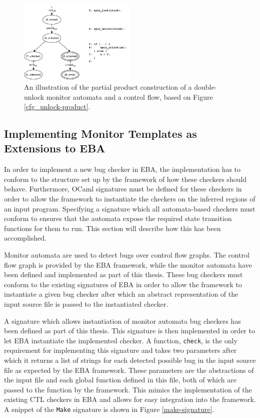 \begin{figure}[H]
    \centering
    \includegraphics[width=0.5\textwidth]{implementation/figures/cfg_unlock-product-partial}
    \caption{An illustration of the partial product construction of a double-unlock monitor automata and a control flow, based on Figure \ref{cfg_unlock-product}.}
    \label{cfg_unlock-product-partial}
\end{figure}

\subsection{Implementing Monitor Templates as Extensions to EBA}
\label{integration-into-eba}

\noindent In order to implement a new bug checker in EBA, the implementation has to conform to the structure set up by the framework of how these checkers should behave. Furthermore, OCaml signatures must be defined for these checkers in order to allow the framework to instantiate the checkers on the inferred regions of an input program. Specifying a signature which all automata-based checkers must conform to ensures that the automata expose the required state transition functions for them to run. This section will describe how this has been accomplished.  

\newpar Monitor automata are used to detect bugs over control flow graphs. The control flow graph is provided by the EBA framework, while the monitor automata have been defined and implemented as part of this thesis. These bug checkers must conform to the existing signatures of EBA in order to allow the framework to instantiate a given bug checker after which an abstract representation of the input source file is passed to the instantiated checker. 

\newpar A signature which allows instantiation of monitor automata bug checkers has been defined as part of this thesis. This signature is then implemented in order to let EBA instantiate the implemented checker. A function, \texttt{check}, is the only requirement for implementing this signature and takes two parameters after which it returns a list of strings for each detected possible bug in the input source file as expected by the EBA framework. These parameters are the abstractions of the input file and each global function defined in this file, both of which are passed to the function by the framework. This mimics the implementation of the existing CTL checkers in EBA and allows for easy integration into the framework. A snippet of the \texttt{Make} signature is shown in Figure \ref{make-signature}.

